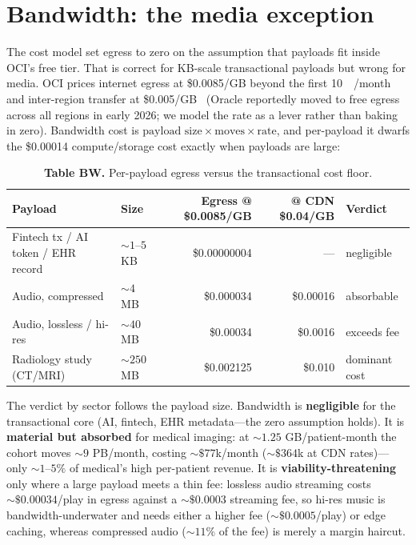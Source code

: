 \documentclass[11pt]{article}
\begin{document}
\section{Bandwidth: the media exception}
\label{sec:bandwidth}

The cost model set egress to zero on the assumption that payloads fit inside OCI's free tier. That is correct for KB-scale transactional payloads but wrong for media. OCI prices internet egress at \$0.0085/GB beyond the first \SI{10}{\tera\byte}/month and inter-region transfer at \$0.005/GB~\cite{oci2026} (Oracle reportedly moved to free egress across all regions in early 2026; we model the rate as a lever rather than baking in zero). Bandwidth cost is $\text{payload size}\times\text{moves}\times\text{rate}$, and per-payload it dwarfs the \$0.00014 compute/storage cost exactly when payloads are large:

\begin{table}[h]
\centering
\caption*{\textbf{Table BW.} Per-payload egress versus the transactional cost floor.}
\begin{tabular}{@{}llrrl@{}}
\toprule
Payload & Size & Egress @ \$0.0085/GB & @ CDN \$0.04/GB & Verdict \\
\midrule
Fintech tx / AI token / EHR record & ${\sim}1$--$5$ KB & \$0.00000004 & --- & negligible \\
Audio, compressed                  & ${\sim}4$ MB   & \$0.000034   & \$0.00016 & absorbable \\
Audio, lossless / hi-res           & ${\sim}40$ MB  & \$0.00034    & \$0.0016  & exceeds fee \\
Radiology study (CT/MRI)           & ${\sim}250$ MB & \$0.002125   & \$0.010   & dominant cost \\
\bottomrule
\end{tabular}
\end{table}

The verdict by sector follows the payload size. Bandwidth is \textbf{negligible} for the transactional core (AI, fintech, EHR metadata---the zero assumption holds). It is \textbf{material but absorbed} for medical imaging: at ${\sim}1.25$ GB/patient-month the cohort moves ${\sim}9$ PB/month, costing ${\sim}\$77$k/month (${\sim}\$364$k at CDN rates)---only ${\sim}1$--$5\%$ of medical's high per-patient revenue. It is \textbf{viability-threatening} only where a large payload meets a thin fee: lossless audio streaming costs ${\sim}\$0.00034$/play in egress against a ${\sim}\$0.0003$ streaming fee, so hi-res music is bandwidth-underwater and needs either a higher fee (${\sim}\$0.0005$/play) or edge caching, whereas compressed audio (${\sim}11\%$ of the fee) is merely a margin haircut.
\end{document}
